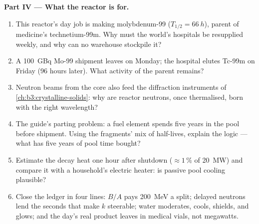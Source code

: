 \begin{problem}
\medskip\noindent\textbf{Part IV --- What the reactor is for.}

\begin{enumerate}[resume]
  \item This reactor's day job is making molybdenum-99
        ($T_{1/2} = \qty{66}{h}$), parent of medicine's
        technetium-99m. Why must the world's hospitals be
        resupplied weekly, and why can no warehouse stockpile it?
  \item A \qty{100}{GBq} Mo-99 shipment leaves on Monday; the
        hospital elutes Tc-99m on Friday (96 hours later). What
        activity of the parent remains?
  \item Neutron beams from the core also feed the diffraction
        instruments of \cref{ch:b3:crystalline-solids}: why are
        reactor neutrons, once thermalised, born with the right
        wavelength?
  \item The guide's parting problem: a fuel element spends five
        years in the pool before shipment. Using the fragments'
        mix of half-lives, explain the logic --- what has five
        years of pool time bought?
  \item Estimate the decay heat one hour after shutdown
        ($\approx1\,\%$ of \qty{20}{MW}) and compare it with a
        household's electric heater: is passive pool cooling
        plausible?
  \item Close the ledger in four lines: $B/A$ pays
        \qty{200}{MeV} a split; delayed neutrons lend the
        seconds that make $k$ steerable; water moderates,
        cools, shields, and glows; and the day's real product
        leaves in medical vials, not megawatts.
\end{enumerate}
\end{problem}

